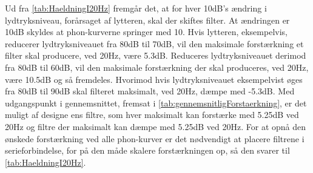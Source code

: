 %
\begin{table}[H]
\centering
{}
\caption{Gennemsnit af differencen i dB, udregnet ved at skalere alle differencer fra \autoref{tab:HaeldningI20Hz}.}
\label{tab:gennemsnitligForstaerkning}
\end{table}
\noindent
%
Ud fra \autoref{tab:HaeldningI20Hz} fremgår det, at for hver 10dB's ændring i lydtryksniveau, forårsaget af lytteren, skal der skiftes filter. At ændringen er 10dB skyldes at phon-kurverne springer med 10. Hvis lytteren, eksempelvis, reducerer lydtryksniveauet fra 80dB til 70dB, vil den maksimale forstærkning et filter skal producere, ved 20Hz, være 5.3dB. Reduceres lydtryksniveauet derimod fra 80dB til 60dB, vil den maksimale forstærkning der skal produceres, ved 20Hz, være 10.5dB og så fremdeles. Hvorimod hvis lydtryksniveauet eksempelvist øges fra 80dB til 90dB skal filteret maksimalt, ved 20Hz, dæmpe med -5.3dB. Med udgangspunkt i gennemsnittet, fremsat i \autoref{tab:gennemsnitligForstaerkning}, er det muligt af designe ens filtre, som hver maksimalt kan forstærke med 5.25dB ved 20Hz og filtre der maksimalt kan dæmpe med 5.25dB ved 20Hz. For at opnå den ønskede forstærkning ved alle phon-kurver er det nødvendigt at placere filtrene i serieforbindelse, for på den måde skalere forstærkningen op, så den svarer til \autoref{tab:HaeldningI20Hz}. 

